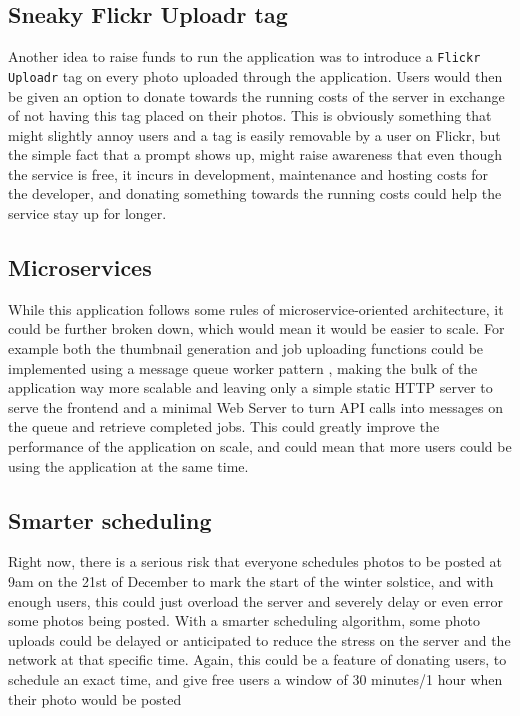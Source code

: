 \documentclass[10pt, a4paper]{article}
\begin{document}
        \subsection{Sneaky Flickr Uploadr tag}
        Another idea to raise funds to run the application was to introduce a \texttt{Flickr Uploadr} tag on every photo uploaded through the application. Users would then be given an option to donate towards the running costs of the server in exchange of not having this tag placed on their photos. This is obviously something that might slightly annoy users and a tag is easily removable by a user on Flickr, but the simple fact that a prompt shows up, might raise awareness that even though the service is free, it incurs in development, maintenance and hosting costs for the developer, and donating something towards the running costs could help the service stay up for longer.
        
        \subsection{Microservices}
        While this application follows some rules of microservice-oriented architecture, it could be further broken down, which would mean it would be easier to scale. For example both the thumbnail generation and job uploading functions could be implemented using a message queue worker pattern \cite{message_queue_pattern}, making the bulk of the application way more scalable and leaving only a simple static HTTP server to serve the frontend and a minimal Web Server to turn API calls into messages on the queue and retrieve completed jobs. This could greatly improve the performance of the application on scale, and could mean that more users could be using the application at the same time.

        \subsection{Smarter scheduling}
        Right now, there is a serious risk that everyone schedules photos to be posted at 9am on the 21st of December to mark the start of the winter solstice, and with enough users, this could just overload the server and severely delay or even error some photos being posted. With a smarter scheduling algorithm, some photo uploads could be delayed or anticipated to reduce the stress on the server and the network at that specific time. Again, this could be a feature of donating users, to schedule an exact time, and give free users a window of 30 minutes/1 hour when their photo would be posted
\end{document}

